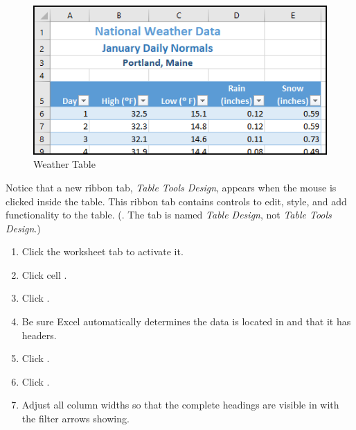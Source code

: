 \begin{figure}[H]
	\centering
	\includegraphics[width=\maxwidth{.95\linewidth}]{gfx/ch05_fig03}
	\caption{Weather Table}
	\label{05:fig03}
\end{figure}

Notice that a new ribbon tab, \textit{Table Tools Design}, appears when the mouse is clicked inside the table. This ribbon tab contains controls to edit, style, and add functionality to the table. (. The tab is named \textit{Table Design}, not \textit{Table Tools Design}.)

\begin{enumerate}
	\item Click the  worksheet tab to activate it.
	\item Click cell .
	\item Click .
	\item Be sure Excel automatically determines the data is located in  and that it has headers.
	\item Click .
	\item Click .
	\item Adjust all column widths so that the complete headings are visible in  with the filter arrows showing. 
\end{enumerate}

